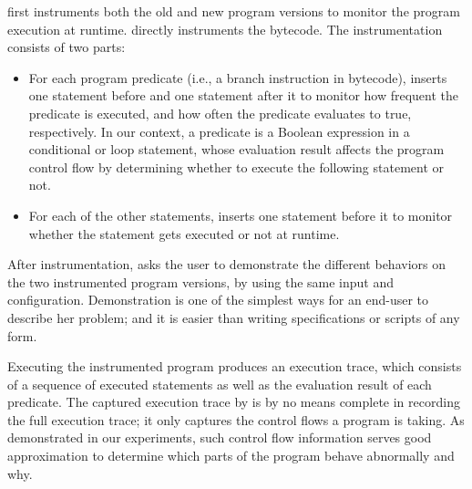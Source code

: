 \ourtool first instruments both the old and new program versions
to monitor the program  execution at runtime. \ourtool directly
instruments the bytecode. The instrumentation
consists of two parts:

\vspace{-2mm}

\begin{itemize}
\item For each program predicate (i.e., a branch instruction
in bytecode), \ourtool inserts one
statement before and one statement after it
to monitor how frequent the predicate is executed, and
how often the predicate evaluates to true, respectively. In our
context, a predicate is a Boolean expression in a
conditional or loop statement,
whose evaluation result affects the program
control flow by determining whether to execute the
following statement or not.


\item For each of the other statements, \ourtool inserts
one statement before it to monitor whether the statement
gets executed or not at runtime.
\end{itemize}


\vspace{-1mm}

After instrumentation, \ourtool asks the user to demonstrate the different
behaviors on the two instrumented program versions, by using
the same input and configuration. Demonstration is
one of the simplest ways for an end-user to describe her problem;
and it is easier than writing specifications or scripts of any form.

Executing the instrumented program produces an execution trace,
which consists of a sequence of executed statements as well
as the evaluation result of each predicate.
The captured execution trace by \ourtool is by no means complete
in recording the full execution trace;  it only
captures the control flows a program is taking. As demonstrated
in our experiments, such control flow information serves
good approximation to determine which parts of the program behave
abnormally and why.



